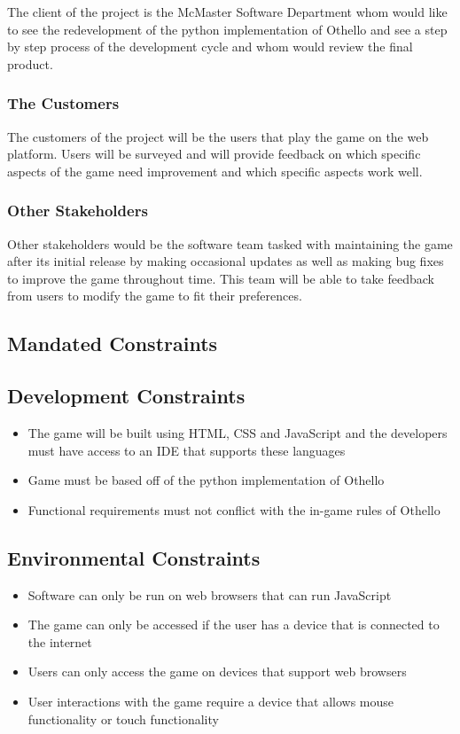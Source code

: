 \documentclass[12pt, titlepage]{article}
\begin{document}
The client of the project is the McMaster Software Department whom would like to see the redevelopment of the python implementation of Othello and see a step by step process of the development cycle and whom would review the final product.

\subsubsection{The Customers}

The customers of the project will be the users that play the game on the web platform. Users will be surveyed and will provide feedback on which specific aspects of the game need improvement and which specific aspects work well.

\subsubsection{Other Stakeholders}

Other stakeholders would be the software team tasked with maintaining the game after its initial release by making occasional updates as well as making bug fixes to improve the game throughout time. This team will be able to take feedback from users to modify the game to fit their preferences.

\subsection{Mandated Constraints}

\subsection{Development Constraints}
\begin{itemize}
	\item The game will be built using HTML, CSS and JavaScript and the developers must have access to an IDE that supports these languages
	\item Game must be based off of the python implementation of Othello
	\item Functional requirements must not conflict with the in-game rules of Othello
\end{itemize}

\subsection{Environmental Constraints}
\begin{itemize}
	\item Software can only be run on web browsers that can run JavaScript
	\item The game can only be accessed if the user has a device that is connected to the internet
	\item Users can only access the game on devices that support web browsers
	\item User interactions with the game require a device that allows mouse functionality or touch functionality
\end{itemize}
\end{document}
